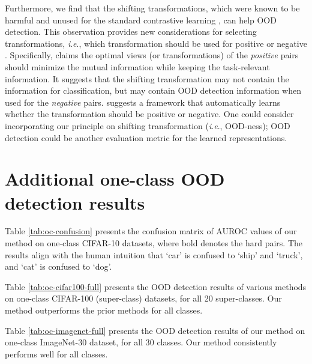 \documentclass{article}
\newcommand{\ie}{\textit{i}.\textit{e}.}
\begin{document}
Furthermore, we find that the shifting transformations, which were known to be harmful and unused for the standard contrastive learning \citep{chen2020simple}, can help OOD detection. This observation provides new considerations for selecting transformations, \ie, which transformation should be used for positive or negative \citep{tian2020makes,xiao2020should}. Specifically, \citet{tian2020makes} claims the optimal views (or transformations) of the \textit{positive} pairs should minimize the mutual information while keeping the task-relevant information. It suggests that the shifting transformation may not contain the information for classification, but may contain OOD detection information when used for the \textit{negative} pairs. \citet{xiao2020should} suggests a framework that automatically learns whether the transformation should be positive or negative. One could consider incorporating our principle on shifting transformation (\ie, OOD-ness); OOD detection could be another evaluation metric for the learned representations.
 
\clearpage
\section{Additional one-class OOD detection results}
\label{appx:oc_more}

Table \ref{tab:oc-confusion} presents the confusion matrix of AUROC values of our method on one-class CIFAR-10 datasets, where bold denotes the hard pairs. The results align with the human intuition that `car' is confused to `ship' and `truck', and `cat' is confused to `dog'.

Table \ref{tab:oc-cifar100-full} presents the OOD detection results of various methods on one-class CIFAR-100 (super-class) datasets, for all 20 super-classes. Our method outperforms the prior methods for all classes.

Table \ref{tab:oc-imagenet-full} presents the OOD detection results of our method on one-class ImageNet-30 dataset, for all 30 classes. Our method consistently performs well for all classes.
\end{document}
